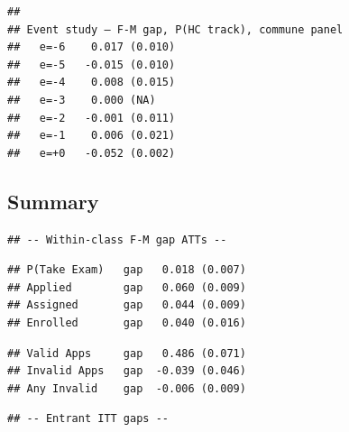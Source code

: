 \documentclass[
]{article}
\begin{document}
\begin{table}[htbp]
   \caption{P(Academic Track) by Gender with Within-Commune Gap}\label{tab: gap hc commune}
   \centerline{}
\end{table}

\begin{verbatim}
## 
## Event study — F-M gap, P(HC track), commune panel 
##   e=-6    0.017 (0.010)
##   e=-5   -0.015 (0.010)
##   e=-4    0.008 (0.015)
##   e=-3    0.000 (NA)
##   e=-2   -0.001 (0.011)
##   e=-1    0.006 (0.021)
##   e=+0   -0.052 (0.002)
\end{verbatim}

\hypertarget{summary}{%
\subsection{Summary}\label{summary}}

\begin{verbatim}
## -- Within-class F-M gap ATTs --
\end{verbatim}

\begin{verbatim}
## P(Take Exam)   gap   0.018 (0.007) 
## Applied        gap   0.060 (0.009) 
## Assigned       gap   0.044 (0.009) 
## Enrolled       gap   0.040 (0.016)
\end{verbatim}

\begin{verbatim}
## Valid Apps     gap   0.486 (0.071) 
## Invalid Apps   gap  -0.039 (0.046) 
## Any Invalid    gap  -0.006 (0.009)
\end{verbatim}

\begin{verbatim}
## -- Entrant ITT gaps --
\end{verbatim}
\end{document}
